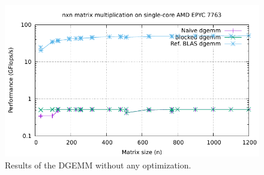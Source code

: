 \documentclass[unicode,11pt,a4paper,oneside,numbers=endperiod,openany]{scrartcl}
\begin{document}
\begin{figure}[H]
    \centering
    \includegraphics[width=\textwidth]{Images/timing_without_opt.pdf}
    \caption{Results of the DGEMM without any optimization.}
    \label{fig:no_opt}
\end{figure}
\end{document}

